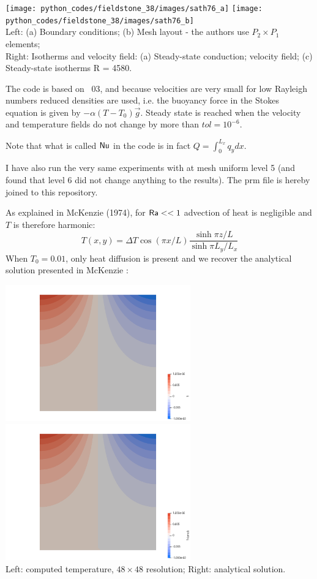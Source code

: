 \begin{center}
\texttt{[image: python\_codes/fieldstone\_38/images/sath76\_a]}
\texttt{[image: python\_codes/fieldstone\_38/images/sath76\_b]}\\
{\captionfont Left: (a) Boundary conditions; (b) Mesh layout - the authors
use $P_2\times P_1$ elements;\\
Right: Isotherms and velocity field: (a) Steady-state conduction;
velocity field; (c) Steady-state isotherms R = 4580.}
\end{center}

The code is based on \stone~03, and because velocities are very small for low Rayleigh numbers
reduced densities are used, i.e. the buoyancy force in the Stokes equation is given by $-\alpha(T-T_0)\vec{g}$.
Steady state is reached when the velocity and temperature fields do not change by more than $tol=10^{-6}$.

Note that what is called ${\mathsf{Nu}}$ in the code is in fact $Q=\int_0^{L_x} q_y dx$.

I have also run the very same experiments with \aspect{} at mesh uniform level 5 (and found that 
level 6 did not change anything to the results). The prm file is hereby joined to this repository.

As explained in McKenzie \etal (1974), for ${\mathsf{Ra}} <<1$ advection of heat is negligible and $T$ is 
therefore harmonic:
\[
T(x,y) = \Delta T \cos (\pi x/L) \frac{\sinh \pi z/L}{\sinh \pi L_y/L_x}
\]
When $T_0=0.01$, only heat diffusion is present and we recover the analytical solution presented 
in McKenzie \etal:

\begin{center}
\includegraphics[width=8cm]{python_codes/fieldstone_38/results/T0_0p001_32x32/T}
\includegraphics[width=8cm]{python_codes/fieldstone_38/results/T0_0p001_32x32/T_anal}\\
{\captionfont Left: computed temperature, $48\times48$ resolution; Right: analytical solution.}
\end{center}

